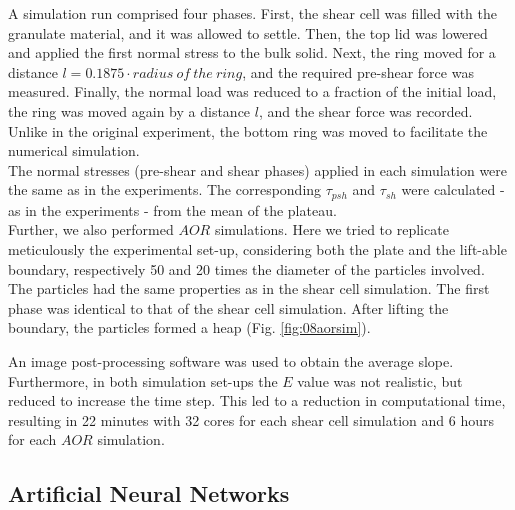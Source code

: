 A simulation run comprised four phases. 
First, the shear cell was filled with the granulate material, and it was allowed to settle. 
Then, the top lid was lowered and applied the first normal stress to the bulk solid. 
Next, the ring moved for a distance $l=0.1875 \cdot radius ~of ~the ~ring$, and the required pre-shear force was measured. 
Finally, the normal load was reduced to a fraction of the initial load, the ring was moved again by a distance $l$, and the shear force was recorded. 
Unlike in the original experiment, the bottom ring was moved to facilitate the numerical simulation.\\
The normal stresses (pre-shear and shear phases) applied in each simulation were
the same as in the experiments. The corresponding $\tau_{psh}$ and $\tau_{sh}$
were calculated - as in the experiments - from the mean of the plateau.\\

Further, we also performed $AOR$ simulations. Here we tried to replicate meticulously the experimental set-up, considering both the plate and the lift-able boundary, 
respectively 50 and 20 times the diameter of the particles involved.
The particles had the same properties as in the shear cell simulation.
The first phase was identical to that of the shear cell simulation. 
After lifting the boundary, the particles formed a heap (Fig. \ref{fig:08aorsim}). 

An image post-processing software was used to obtain the average slope.
Furthermore, in both simulation set-ups the $E$ value was not realistic, but reduced to increase the time step.
This led to a reduction in computational time, resulting in 22 minutes with 32 cores for each shear cell simulation and 6 hours for each $AOR$ simulation.\\

\subsection{Artificial Neural Networks}
\label{subsec:ann}

